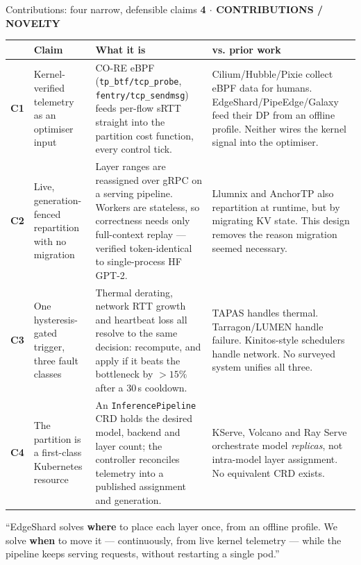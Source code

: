 \documentclass[aspectratio=169,9pt]{beamer}
\newcommand{\kicker}[1]{{\scriptsize\color{keBlue}\bfseries\MakeUppercase{#1}}\par\vspace{0.2em}}
\begin{document}
\begin{frame}[shrink=25]{Contributions: four narrow, defensible claims}
  \kicker{4 $\cdot$ Contributions / Novelty}
  \renewcommand{\arraystretch}{1.3}
  \scriptsize
  \begin{tabularx}{\textwidth}{@{}c p{3.4cm} X X@{}}
    \toprule
    & \color{keNavy}\bfseries Claim &
      \color{keNavy}\bfseries What it is &
      \color{keNavy}\bfseries vs. prior work \\
    \midrule
    {\color{keBlue}\bfseries C1} &
    Kernel-verified telemetry as an optimiser input &
    CO-RE eBPF (\texttt{tp\_btf/tcp\_probe}, \texttt{fentry/tcp\_sendmsg}) feeds
    per-flow sRTT straight into the partition cost function, every control tick. &
    Cilium/Hubble/Pixie collect eBPF data for humans. EdgeShard/PipeEdge/Galaxy
    feed their DP from an offline profile. Neither wires the kernel signal into
    the optimiser. \\
    {\color{keGreen}\bfseries C2} &
    Live, generation-fenced repartition with no migration &
    Layer ranges are reassigned over gRPC on a serving pipeline. Workers are
    stateless, so correctness needs only full-context replay --- verified
    token-identical to single-process HF GPT-2. &
    Llumnix and AnchorTP also repartition at runtime, but by migrating KV
    state. This design removes the reason migration seemed necessary. \\
    {\color{keOrange}\bfseries C3} &
    One hysteresis-gated trigger, three fault classes &
    Thermal derating, network RTT growth and heartbeat loss all resolve to the
    same decision: recompute, and apply if it beats the bottleneck by
    $>15\%$ after a 30\,s cooldown. &
    TAPAS handles thermal. Tarragon/LUMEN handle failure. Kinitos-style
    schedulers handle network. No surveyed system unifies all three. \\
    {\color{kePurple}\bfseries C4} &
    The partition is a first-class Kubernetes resource &
    An \texttt{InferencePipeline} CRD holds the desired model, backend and layer
    count; the controller reconciles telemetry into a published assignment and
    generation. &
    KServe, Volcano and Ray Serve orchestrate model \emph{replicas}, not
    intra-model layer assignment. No equivalent CRD exists. \\
    \bottomrule
  \end{tabularx}
  \vspace{0.5em}
  \colorbox{keNavy}{\begin{minipage}{0.975\textwidth}\vspace{0.3em}
    {\small\color{white} ``EdgeShard solves \textbf{where} to place each layer
    once, from an offline profile. We solve \textbf{when} to move it ---
    continuously, from live kernel telemetry --- while the pipeline keeps serving
    requests, without restarting a single pod.''}
  \vspace{0.3em}\end{minipage}}
\end{frame}
\end{document}
